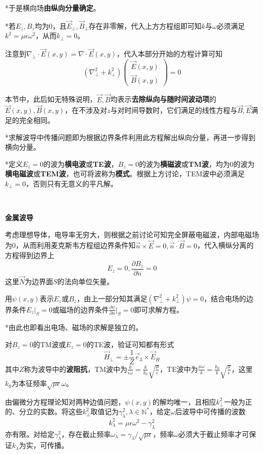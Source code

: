\documentclass[a4paper,UTF8,fontset=windows]{ctexart}
\newcommand*{\vb}{\vec{B}}
\newcommand*{\ve}{\vec{E}}
\newcommand*{\vh}{\vec{H}}
\newcommand*{\vn}{\vec{N}}
\newcommand*{\ves}{\vec{e}}
\newcommand*{\vns}{\vec{n}}
\newcommand*{\pt}[2][t]{\frac{\partial #2}{\partial #1}}
\begin{document}
*于是横向场\textbf{由纵向分量确定}。

*若$E_z,B_z$均为0，且$\ve_\bot,\vb_\bot$存在非零解，代入上方方程组即可知$k$与$\omega$必须满足$k^2=\mu\epsilon\omega^2$，从而$k_\bot=0$。

注意到$\nabla_\bot\cdot\ve(x,y)=\nabla\cdot\ve(x,y)$，代入本部分开始的方程计算可知
$$(\nabla_\bot^2+k_\bot^2)\begin{pmatrix}\ve(x,y)\\\vb(x,y)\end{pmatrix}=0$$

本节中，此后如无特殊说明，$\ve,\vb$均表示\textbf{去除纵向与随时间波动项}的$\ve(x,y),\vb(x,y)$，在不涉及对$z$与对时间导数时，它们满足的线性方程与$\vb,\ve$满足的完全相同。

*求解波导中传播问题即为根据边界条件利用此方程解出纵向分量，再进一步得到横向分量。

*定义$E_z=0$的波为\textbf{横电波}或\textbf{TE波}，$B_z=0$的波为\textbf{横磁波}或\textbf{TM波}，均为0的波为\textbf{横电磁波}或\textbf{TEM波}，也可将波称为\textbf{模式}。根据上方讨论，TEM波中必须满足$k_\bot=0$，否则只有无意义的平凡解。

\

\textbf{金属波导}

考虑理想导体，电导率无穷大，则根据之前讨论可知完全屏蔽电磁波，内部电磁场为0，从而利用麦克斯韦方程组边界条件知$\vns\times\ve=0,\vns\cdot\vb=0$，代入横纵分离的方程得到边界上
$$E_z=0,\pt[n]{B_z}=0$$
这里$\vn$为边界面$S$的法向单位矢量。

用$\psi(x,y)$表示$E_z$或$B_z$，由上一部分知其满足$(\nabla_\bot^2+k_\bot^2)\psi=0$，结合电场的边界条件$E_z|_S=0$或磁场的边界条件$\pt[n]{\psi}\big|_S=0$即可求解方程。

*由此也即看出电场、磁场的求解是独立的。

对$B_z=0$的TM波或$E_z=0$的TE波，验证可知都有形式
$$\vh_\bot=\pm\frac{1}{Z}\ves_3\times\ve_H$$
其中$Z$称为波导中的\textbf{波阻抗}，TM波中为$\frac{k}{\epsilon\omega}=\frac{k}{k_0}\sqrt{\frac{\mu}{\epsilon}}$，TE波中为$\frac{\mu\omega}{k}=\frac{k_0}{k}\sqrt{\frac{\mu}{\epsilon}}$，这里$k_0$为本征频率$\sqrt{\mu\epsilon}\omega$。

由偏微分方程理论知对两种边值问题，$\psi(x,y)$的解均唯一，且相应$k_\bot^2$一般为正的、分立的实数。将这些$k_\bot^2$取值记为$\gamma_\lambda^2,\lambda\in\mathbb{N}^*$，给定$\omega$后波导中可传播的波数
$$k_\lambda^2=\mu\epsilon\omega^2-\gamma_\lambda^2$$
亦有限。对给定$\gamma_\lambda^2$，存在截止频率$\omega_\lambda=\gamma_\lambda/\sqrt{\mu\epsilon}$，频率$\omega$必须大于截止频率才可保证$k_\lambda$为实，可传播。
\end{document}
